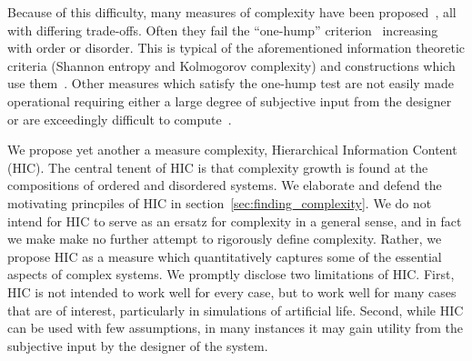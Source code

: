 Because of this difficulty, many measures of complexity have been
proposed~\citep{lloyd2001measures}, all with differing trade-offs. Often they
fail the ``one-hump'' criterion~\citep{adami2002complexity} increasing with
order or disorder. This is typical of the aforementioned information theoretic
criteria (Shannon entropy and Kolmogorov complexity) and constructions which
use them~\citep{lloyd1988complexity}. Other measures which satisfy the one-hump
test are not easily made operational requiring either a large degree of
subjective input from the designer or are exceedingly difficult to
compute~\citep{crutchfield1989inferring, gell1996information,
grassberger1986toward}.

We propose yet another a measure complexity, Hierarchical Information Content
(HIC). The central tenent of HIC is that complexity growth is found at the
compositions of ordered and disordered systems. We elaborate and defend the
motivating princpiles of HIC in section~\ref{sec:finding_complexity}. We do not
intend for HIC to serve as an ersatz for complexity in a general sense, and in
fact we make make no further attempt to rigorously define complexity. Rather,
we propose HIC as a measure which quantitatively captures some of the essential
aspects of complex systems. We promptly disclose two limitations of HIC. First,
HIC is not intended to work well for every case, but to work well for many
cases that are of interest, particularly in simulations of artificial life.
Second, while HIC can be used with few assumptions, in many instances it may
gain utility from the subjective input by the designer of the system.
